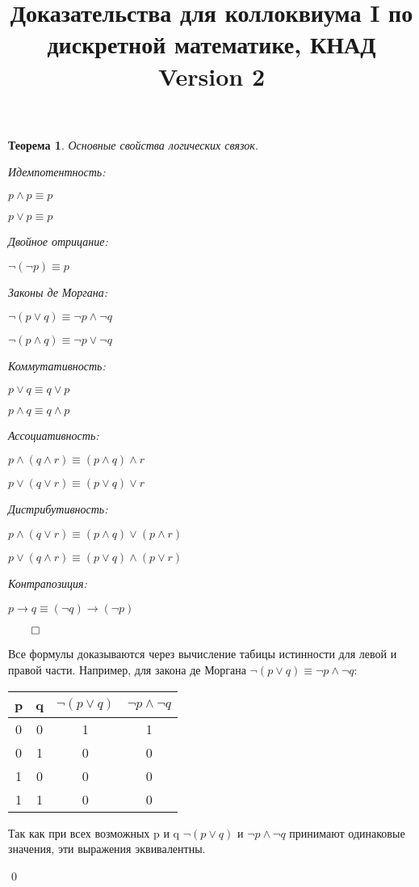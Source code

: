 \documentclass[a4paper,12pt,leqno]{article}
\title{Доказательства для коллоквиума I по дискретной математике, КНАД  \\ \small Version 2}
\theoremstyle{plain} %
\newtheorem{theorem}{Теорема}
\theoremstyle{definition} %
\renewenvironment{proof}{$\qed$}{{\qed}} %
\begin{document}
\maketitle

\begin{theorem}
Основные свойства логических связок.

Идемпотентность:

\quad $ p \wedge p \equiv p$

\quad  $ p \vee p \equiv p$

Двойное отрицание:

\quad  $\neg (\neg p) \equiv p $

Законы де Моргана:

\quad  $\neg(p \vee q) \equiv \neg p \wedge \neg q $

\quad  $\neg(p \wedge q) \equiv \neg p \vee \neg q $

Коммутативность:

\quad  $ p \vee q \equiv q \vee p$

\quad  $ p \wedge q \equiv q \wedge p$

Ассоциативность:

\quad $ p \wedge (q \wedge r) \equiv (p \wedge q) \wedge r$

\quad  $ p \vee (q \vee r) \equiv (p \vee q) \vee r$

Дистрибутивность:

\quad  $ p \wedge (q \vee r) \equiv (p \wedge q) \vee (p \wedge r) $

\quad  $ p \vee (q \wedge r) \equiv (p \vee q) \wedge (p \vee r) $

Контрапозиция:

\quad  $p \rightarrow q \equiv (\neg q)\rightarrow (\neg p)   $

\end{theorem}
\begin{proof}

Все формулы доказываются через вычисление табицы истинности для левой и правой части. Например, для закона де Моргана $\neg(p \vee q) \equiv \neg p \wedge \neg q $:

\begin{tabular}{cc|c|c}
p & q & $\neg(p \vee q) $ & $ \neg p \wedge \neg q$\\
\hline
0 & 0 & 1 & 1\\
0 & 1 & 0 & 0\\
1 & 0 & 0 & 0\\
1 & 1 & 0 & 0\\
\end{tabular}

Так как при всех возможных p и q $\neg(p \vee q) $  и $ \neg p \wedge \neg q$ принимают одинаковые значения, эти выражения эквивалентны.

\end{proof}
\end{document}
